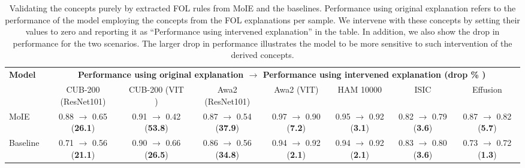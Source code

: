\begin{table*}[h]
\caption{Validating the concepts purely by extracted FOL rules from MoIE and the baselines. Performance using original explanation refers to the performance of the model employing the concepts from the FOL explanations per sample. We intervene with these concepts by setting their values to zero and reporting it as ``Performance using intervened explanation'' in the table. In addition, we also show the drop in performance for the two scenarios. The larger drop in performance illustrates the model to be more sensitive to such intervention of the derived concepts.}\smallskip
\fontsize{6.75pt}{0.30cm}
\selectfont
\centering
\begin{tabular}{p{2.7em} c c c c c c c}
\toprule 
        \textbf{Model} & \multicolumn{7}{c}{\textbf{Performance using original explanation $\longrightarrow$ Performance using intervened explanation (drop \% )}} \\
       & CUB-200 (ResNet101) & CUB-200 (VIT )& Awa2 (ResNet101) & Awa2 (VIT) & HAM 10000 & ISIC  
       & Effusion\\
\midrule 
    MoIE & 
        0.88 $\rightarrow$ 0.65 (\textbf{26.1}) & 
        0.91 $\rightarrow$ 0.42 (\textbf{53.8}) & 
        0.87 $\rightarrow$ 0.54 (\textbf{37.9}) & 
        0.97 $\rightarrow$ 0.90 (\textbf{7.2})  & 
        0.95 $\rightarrow$ 0.92 (\textbf{3.1})  & 
        0.82 $\rightarrow$ 0.79 (\textbf{3.6})  &
        0.87 $\rightarrow$ 0.82 (\textbf{5.7}) 
    \\
\midrule 
    Baseline & 
        0.71 $\rightarrow$ 0.56 (\textbf{21.1}) & 
        0.90 $\rightarrow$ 0.66 (\textbf{26.5}) & 
        0.86 $\rightarrow$ 0.56 (\textbf{34.8}) & 
        0.94 $\rightarrow$ 0.92 (\textbf{2.1}) & 
        0.94 $\rightarrow$ 0.92 (\textbf{2.1}) &
        0.83 $\rightarrow$ 0.80 (\textbf{3.6}) &
        0.73 $\rightarrow$ 0.72 (\textbf{1.3})
        \\
\bottomrule
\end{tabular}
\label{tab:cf_table}
\end{table*}